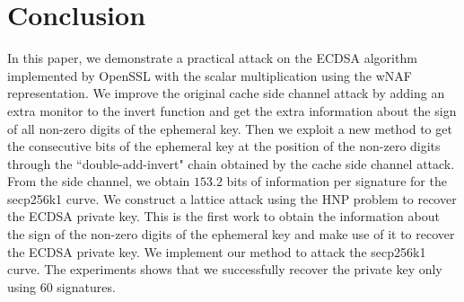 \section{Conclusion}
\label{sec:conclusion}
In this paper, we demonstrate a practical attack on the ECDSA algorithm implemented by OpenSSL with the scalar multiplication using the wNAF representation.
We improve the original cache side channel attack by adding an extra monitor to the invert function and get the extra information about the sign of all non-zero digits of the ephemeral key.
Then we exploit a new method to get the consecutive bits of the ephemeral key at the position of the non-zero digits through the ``double-add-invert" chain obtained by the cache side channel attack.
From the side channel, we obtain $153.2$ bits of information per signature for the secp256k1 curve.
We construct a lattice attack using the HNP problem to recover the ECDSA private key.
This is the first work to obtain the information about the sign of the non-zero digits of the ephemeral key and make use of it to recover the ECDSA private key.
We implement our method to attack the secp256k1 curve.
The experiments shows that we successfully recover the private key only using $60$ signatures.


